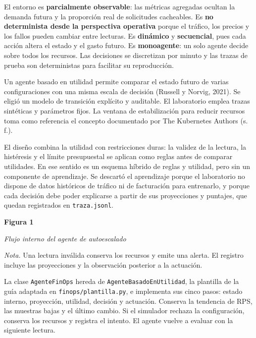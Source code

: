 \documentclass[12pt,letterpaper]{article}
\newcommand{\niveluno}[1]{\par\vspace{.35\baselineskip}\noindent\makebox[\linewidth][c]{\textbf{#1}}\par}
\begin{document}
El entorno es \textbf{parcialmente observable}: las métricas agregadas ocultan la demanda futura y la proporción real de solicitudes cacheables. Es \textbf{no determinista desde la perspectiva operativa} porque el tráfico, los precios y los fallos pueden cambiar entre lecturas. Es \textbf{dinámico} y \textbf{secuencial}, pues cada acción altera el estado y el gasto futuro. Es \textbf{monoagente}: un solo agente decide sobre todos los recursos. Las decisiones se discretizan por minuto y las trazas de prueba son deterministas para facilitar su reproducción.

\newpage
\niveluno{Arquitectura del agente}

Un agente basado en utilidad permite comparar el estado futuro de varias configuraciones con una misma escala de decisión (Russell y Norvig, 2021). Se eligió un modelo de transición explícito y auditable. El laboratorio emplea trazas sintéticas y parámetros fijos. La ventana de estabilización para reducir recursos toma como referencia el concepto documentado por The Kubernetes Authors (s. f.).

El diseño combina la utilidad con restricciones duras: la validez de la lectura, la histéresis y el límite presupuestal se aplican como reglas antes de comparar utilidades. En ese sentido es un esquema híbrido de reglas y utilidad, pero sin un componente de aprendizaje. Se descartó el aprendizaje porque el laboratorio no dispone de datos históricos de tráfico ni de facturación para entrenarlo, y porque cada decisión debe poder explicarse a partir de sus proyecciones y puntajes, que quedan registrados en \texttt{traza.jsonl}.

\noindent\begin{minipage}{\linewidth}
\noindent\textbf{Figura 1}\par
\noindent\textit{Flujo interno del agente de autoescalado}\par
\begingroup\centering\par\endgroup
\noindent\small\textit{Nota.} Una lectura inválida conserva los recursos y emite una alerta. El registro incluye las proyecciones y la observación posterior a la actuación.\par\normalsize
\end{minipage}\par\vspace{.6\baselineskip}

La clase \texttt{AgenteFinOps} hereda de \texttt{AgenteBasadoEnUtilidad}, la plantilla de la guía adaptada en \texttt{finops/plantilla.py}, e implementa sus cinco pasos: estado interno, proyección, utilidad, decisión y actuación. Conserva la tendencia de RPS, las muestras bajas y el último cambio. Si el simulador rechaza la configuración, conserva los recursos y registra el intento. El agente vuelve a evaluar con la siguiente lectura.
\end{document}
